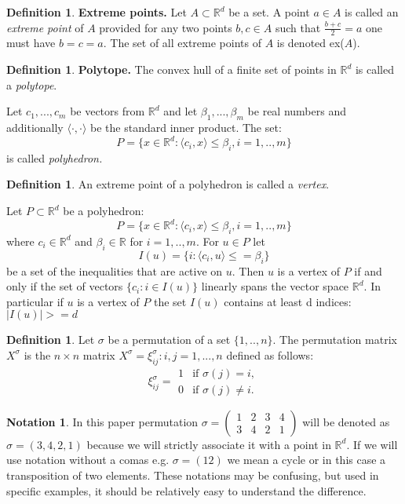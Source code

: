 \documentclass[11pt]{article}
\theoremstyle{plain}
\theoremstyle{definition}
\newtheorem{definition}[thm]{Definition}
\newtheorem*{notation}{Notation}
\renewcommand\leq{\leqslant}
\begin{document}
\begin{definition}\label{def Extreme Points}
\textbf{Extreme points.} Let $A \subset \mathbb{R}^d $ be a set. A point $a \in A$ is called an \textit{extreme point} of $A$ provided for any two points $b,c \in A$  such that $\frac{b+c}{2} = a$ one must have $b = c = a$. The set of all extreme points of $A$ is denoted ex($A$).  
\end{definition}

\begin{definition} \label{def2}
\textbf{Polytope.} The convex hull of a finite set of points in $ \mathbb{R}^d$ is called a \textit{polytope}.
\end{definition}
Let $c_{1},..., c_{m}$ be vectors from $ \mathbb{R}^d$ and let $\beta_{1}, ... , \beta_{m}$ be real numbers and additionally $\langle \cdot,\cdot \rangle$ be  the standard inner product. The set:
$$P = \{ x \in \mathbb{R}^d : \langle c_{i},x \rangle \leq \beta_{i},  i=1,..,m\}$$
is called \textit{polyhedron.}
\begin{definition}
    An extreme point of a polyhedron is called a \textit{vertex}.
\end{definition}
\begin{Theorem}
    Let $P \subset \mathbb{R}^d$ be a polyhedron:
    $$P = \{ x \in \mathbb{R}^d : \langle c_{i},x \rangle \leq \beta_{i},  i=1,..,m\}$$
    where $c_i \in \mathbb{R}^d$ and $\beta_i \in \mathbb{R}$ for $i=1,..,m$.
    For $u \in P$ let
    $$I(u) = \{i:\langle c_{i},u \rangle \leq = \beta_i \}$$
    be a set of the inequalities that are active on $u$. Then $u$ is a vertex of $P$ if and only if the set of vectors $\{c_i : i \in I(u) \}$ linearly spans the vector space $\mathbb{R}^d$. In particular if $u$ is a vertex of $P$ the set $I(u)$ contains at least d indices: $|I(u)| >= d$
\end{Theorem}
\begin{definition}\label{def3} 
Let $\sigma$ be a permutation of a set $\{1,..,n\}$. The permutation matrix $X^\sigma$ is the $n\times n$ matrix $X^\sigma = \xi^{\sigma}_{ij} : i,j = 1,...,n$ defined as follows:
$$ \xi^{\sigma}_{ij} =  \begin{array}{cc}
  1   & \textrm{if } \sigma(j)=i, \\
 0    & \textrm{if } \sigma(j)\neq i.
\end{array}  $$
\end{definition}
\begin{notation}
In this paper permutation $\sigma = \begin{pmatrix}1 & 2 & 3& 4 \\ 3&4&2&1\end{pmatrix}$ will be denoted as $\sigma = (3,4,2,1)$ because we will strictly associate it with a point in $\mathbb{R}^d$. If we will use notation without a comas e.g. $\sigma = (1 2)$ we mean a cycle or in this case a transposition of two elements. These notations may be confusing, but used in specific examples, it should be relatively easy to understand the difference.  
\end{notation}
\end{document}
